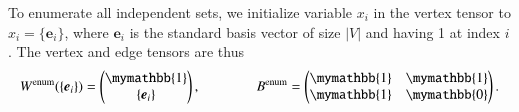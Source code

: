 \documentclass[onefignum, onetabnum]{siamart190516}
\newcommand{\<}{\langle}
\renewcommand{\>}{\rangle}
\begin{document}
To enumerate all independent sets, 
we initialize variable $x_{i}$ in the vertex tensor to $x_i = \{\boldsymbol{e}_{i}\}$, where $\boldsymbol{e}_i$ is the standard basis vector of size $|V|$ and having 1 at index $i$.
The vertex and edge tensors are thus
\begin{equation}
    W^{\rm enum}(\{\boldsymbol{e}_{i}\}) = \left(\begin{matrix}
        \mymathbb{1} \\
        \{\boldsymbol{e}_{i}\}
    \end{matrix}\right),   
    \qquad \qquad
        B^{\rm enum} = \left(\begin{matrix}
        \mymathbb{1}  & \mymathbb{1} \\
        \mymathbb{1} & \mymathbb{0}
    \end{matrix}\right).
\end{equation}
\end{document}
